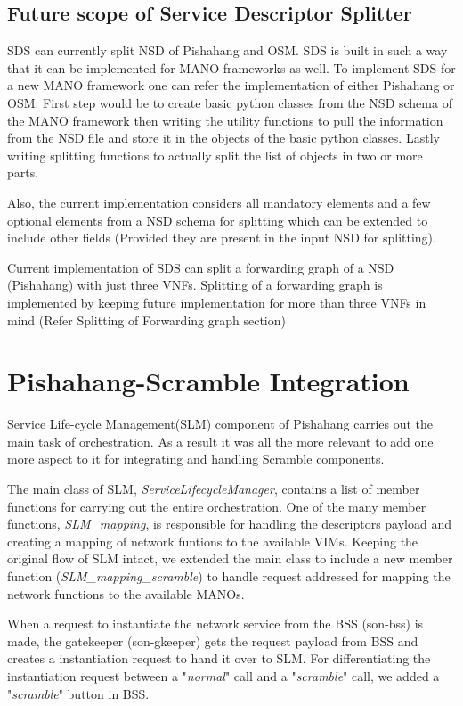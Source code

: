 \subsection{Future scope of Service Descriptor Splitter}
SDS can currently split NSD of Pishahang and OSM. SDS is built in such a way that it can be implemented for MANO frameworks as well. To implement SDS for a new MANO framework one can refer the implementation of either Pishahang or OSM. First step would be to create basic python classes from the NSD schema of the MANO framework then writing the utility functions to pull the information from the NSD file and store it in the objects of the basic python classes. Lastly writing splitting functions to actually split the list of objects in two or more parts.

Also, the current implementation considers all mandatory elements and a few optional elements from a NSD schema for splitting which can be extended to include other fields (Provided they are present in the input NSD for splitting).

Current implementation of SDS can split a forwarding graph of a NSD (Pishahang) with just three VNFs. Splitting of a forwarding graph is implemented by keeping future implementation for more than three VNFs in mind (Refer Splitting of Forwarding graph section)



\section{Pishahang-Scramble Integration}

Service Life-cycle Management(SLM) component of Pishahang carries out the main task of orchestration. As a result it was all the more relevant to add one more aspect to it for integrating and handling Scramble components.

The main class of SLM, \textit{ServiceLifecycleManager}, contains a list of member functions for carrying out the entire orchestration. One of the many member functions, \textit{SLM\_mapping}, is responsible for handling the descriptors payload and creating a mapping of network funtions to the available VIMs. Keeping the original flow of SLM intact, we extended the main class to include a new member function (\textit{SLM\_mapping\_scramble}) to handle request addressed for mapping the network functions to the available MANOs.

When a request to instantiate the network service from the BSS (son-bss) is made, the gatekeeper (son-gkeeper) gets the request payload from BSS and creates a instantiation request to hand it over to SLM. For differentiating the instantiation request between a "\textit{normal}" call and a "\textit{scramble}" call, we added a "\textit{scramble}" button in BSS. 

